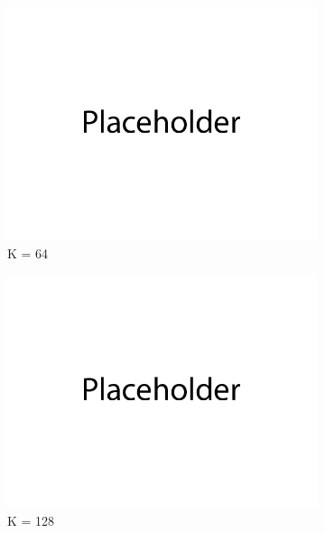 \documentclass{article}
\begin{document}
   \newpage
   
\begin{figure}[H]
    \centering
    \begin{subfigure}{0.32\textwidth}
        \centering
        \includegraphics[width=\textwidth]{figures/q3_codebook_histogram_64}
        \caption{K = 64}
    \end{subfigure}
    \begin{subfigure}{0.32\textwidth}
        \centering
        \includegraphics[width=\textwidth]{figures/q3_codebook_histogram_128}
        \caption{K = 128}
    \end{subfigure}
    \begin{subfigure}{0.32\textwidth}
        \centering

\end{subfigure}
\end{figure}
\end{document}
